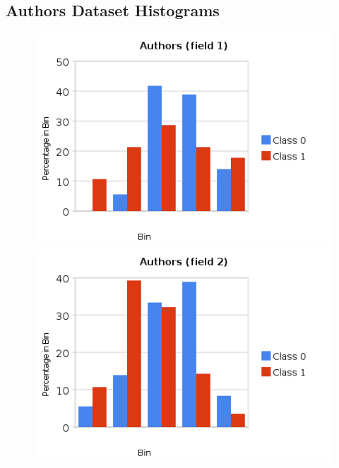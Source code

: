 \documentclass[a4paper,10pt]{article}
\begin{document}
        \newpage

        \subsection{Authors Dataset Histograms}

        \begin{figure}[ht!]
          \begin{minipage}[b]{0.5\linewidth}
            \includegraphics[scale=0.45]{charts/AuthorsPics/A1.png}
          \end{minipage}
          \begin{minipage}[b]{0.5\linewidth}
             \includegraphics[scale=0.45]{charts/AuthorsPics/A2.png}
          \end{minipage}
        \end{figure}
\end{document}
